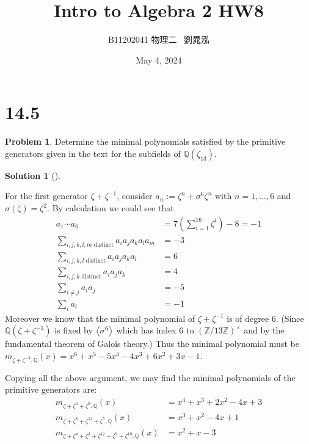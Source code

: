 \documentclass{article}
\title{Intro to Algebra 2 HW8}
\author{B11202041 物理二 \, 劉晁泓}
\date{May 4, 2024}
\theoremstyle{definition}
\newtheorem{prob}{Problem}
\newtheorem*{sol}{Solution}
\newenvironment{sols}[1][]{%
  \begin{sol}[#1]$ $\par\nobreak\ignorespaces
}{%
  \end{sol}
}
\newcommand{\QQ}{\mathbb Q}
\newcommand{\ZZ}{\mathbb Z}
\begin{document}
\maketitle
\thispagestyle{fancy}
\renewcommand{\footrulewidth}{0.4pt}
\cfoot{\thepage}
\renewcommand{\headrulewidth}{0.4pt}

\section*{14.5}

\begin{prob}
	Determine the minimal polynomials satisfied by the primitive generators given in the text for the subfields of $\QQ(\zeta_{13})$.
\end{prob}

\begin{sols}
	\par For the first generator $\zeta + \zeta^{-1}$, consider $a_n := \zeta^n + \sigma^6 \zeta^n$ with $n = 1, ..., 6$ and $\sigma(\zeta) = \zeta^2$.
	By calculation we could see that
	\[
		\begin{split}
			a_1 \cdots a_6 &= 7 \left(\sum_{i = 1}^{16} \zeta^i\right) - 8 = -1\\
			\sum_{i, j, k, l, m \text{ distinct}} a_i a_j a_k a_l a_m &= -3\\
			\sum_{i, j, k, l \text{ distinct}} a_i a_j a_k a_l &= 6\\
			\sum_{i, j, k \text{ distinct}} a_i a_j a_k &= 4\\
			\sum_{i \neq j} a_i a_j &= -5\\
			\sum_i a_i &= -1
		\end{split}
	\]
	Moreover we know that the minimal polynomial of $\zeta + \zeta^{-1}$ is of degree 6.
	(Since $\QQ(\zeta + \zeta^{-1})$ is fixed by $\ev{\sigma^6}$ which has index 6 to $(\ZZ/13 \ZZ)^\times$ and by the fundamental theorem of Galois theory.)
	Thus the minimal polynomial must be $m_{\zeta + \zeta^{-1}, \QQ} (x)= x^6 + x^5 - 5 x^4 - 4 x^3 + 6 x^2 + 3 x - 1$. 

	\par Copying all the above argument, we may find the minimal polynomials of the primitive generators are:
	\[
		\begin{split}
			m_{\zeta + \zeta^3 + \zeta^9, \QQ} (x)&= x^4 + x^3 + 2 x^2 - 4x + 3\\
			m_{\zeta + \zeta^8 + \zeta^{12} + \zeta^5, \QQ} (x)&= x^3 + x^2 - 4x + 1\\
			m_{\zeta + \zeta^4 + \zeta^3 + \zeta^{12} + \zeta^9 + \zeta^{10}, \QQ} (x)&= x^2 + x - 3
		\end{split}
	\]
\end{sols}
\end{document}

